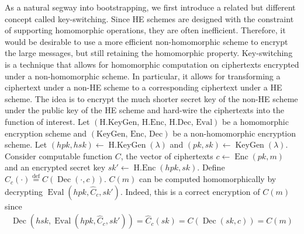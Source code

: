 As a natural segway into bootstrapping, we first introduce a related but different concept called key-switching. Since HE schemes are designed with the constraint of supporting homomorphic operations, they are often inefficient. Therefore, it would be desirable to use a more efficient non-homomorphic scheme to encrypt the large messages, but still retaining the homomorphic property. Key-switching is a technique that allows for homomorphic computation on ciphertexts encrypted under a non-homomorphic scheme. In particular, it allows for transforming a ciphertext under a non-HE scheme to a corresponding ciphertext under a HE scheme. The idea is to encrypt the much shorter secret key of the non-HE scheme under the public key of the HE scheme and hard-wire the ciphertexts into the function of interest. 
Let $(\text{H.KeyGen, H.Enc, H.Dec, Eval})$ be a homomorphic encryption scheme and $(\text{KeyGen, Enc, Dec})$ be a non-homomorphic encryption scheme. Let $(hpk,hsk) \leftarrow \operatorname{H.KeyGen}(\lambda)$ and $(pk,sk) \leftarrow \operatorname{KeyGen}(\lambda)$. Consider computable function $C$, the vector of ciphertexts $c \leftarrow \operatorname{Enc}(pk,m)$ and an encrypted secret key $sk' \leftarrow \operatorname{H.Enc}(hpk,sk)$. Define $\hat{C}_c(\cdot) \stackrel{\mathrm{def}}{=} C(\operatorname{Dec}(\cdot, c))$. $C(m)$ can be computed homomorphically by decrypting $\operatorname{Eval}(hpk,\hat{C}_c, sk')$. Indeed, this is a correct encryption of $C(m)$ since
\begin{equation*}
    \begin{aligned}
        \operatorname{Dec}(hsk,\operatorname{Eval}(hpk,\hat{C}_c, sk')) = \hat{C}_c(sk) = C(\operatorname{Dec}(sk, c)) = C(m)
    \end{aligned}
\end{equation*}
